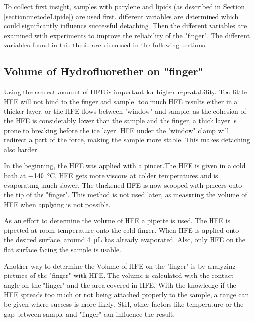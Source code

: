 To collect first insight, samples with parylene and lipids (as described in Section \ref{section:metodeLipide}) are used first. different variables are determined which could significantly influence successful detaching. Then the different variables are examined with experiments to improve the reliability of the "finger". The different variables found in this thesis are discussed in the following sections.

\subsection{Volume of Hydrofluorether on "finger"}

Using the correct amount of HFE is important for higher repeatability. Too little HFE will not bind to the finger and sample. too much HFE results either in a thicker layer, or the HFE flows between "window" and sample.
as the cohesion of the HFE is considerably lower than the sample and the finger, a thick layer is prone to breaking before the ice layer. HFE under the "window" clamp will redirect a part of the force, making the sample more stable. This makes detaching also harder.

In the beginning, the HFE was applied with a pincer.The HFE is given in a cold bath at \SI{-140}{\degreeCelsius}. HFE gets more viscous at colder temperatures and is evaporating much slower. The thickened HFE is now scooped with pincers onto the tip of the "finger". This method is not used later, as measuring the volume of HFE when applying is not possible.

As an effort to determine the volume of HFE a pipette is used. The HFE is pipetted at room temperature onto the cold finger. When HFE is applied onto the desired surface, around \SI{4}{\micro\liter} has already evaporated. Also, only HFE on the flat surface facing the sample is usable.

Another way to determine the Volume of HFE on the "finger" is by analyzing pictures of the "finger" with HFE. The volume is calculated with the contact angle on the "finger" and the area covered in HFE. With the knowledge if the HFE spreads too much or not being attached properly to the sample, a range can be given where success is more likely. Still, other factors like temperature or the gap between sample and "finger" can influence the result.

